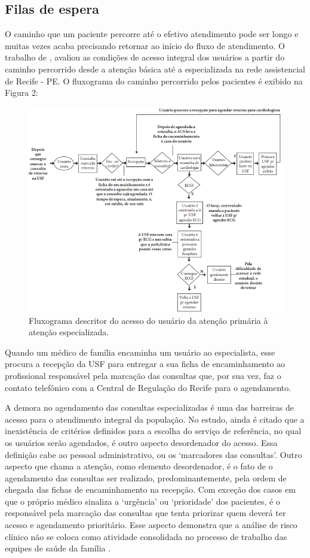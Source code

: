      \subsection{Filas de espera}
    
    O caminho que um paciente percorre até o efetivo atendimento pode ser longo e muitas vezes acaba precisando retornar ao início do fluxo de atendimento. O trabalho de , avaliou as condições de acesso integral dos usuários a partir do caminho percorrido desde a atenção básica até a especializada na rede assistencial de Recife - PE. O fluxograma do caminho percorrido pelos pacientes é exibido na Figura 2:
    
     \begin{figure}[htbp]
        	\centering
            \caption{Fluxograma descritor do acesso do usuário da atenção primária à atenção especializada.}
            \label{fig:images/fluxograma-trajetoria-usf-pe}
            \includegraphics[width=0.8\linewidth]{images/fluxograma-trajetoria-usf-pe}
        \end{figure}
        
    Quando um médico de família encaminha um usuário ao especialista, esse procura a recepção da USF para entregar a sua ficha de encaminhamento ao profissional responsável pela marcação das consultas que, por sua vez, faz o contato telefônico com a Central de Regulação do Recife para o agendamento.
    
    A demora no agendamento das consultas especializadas é uma das barreiras de acesso para o atendimento integral da população. No estudo, ainda é citado que a inexistência de critérios definidos para a escolha do serviço de referência, no qual os usuários serão agendados, é outro aspecto desordenador do acesso. Essa definição cabe ao pessoal administrativo, ou os ‘marcadores das consultas’. Outro aspecto que chama a atenção, como elemento desordenador, é o fato de o agendamento das consultas ser realizado, predominantemente, pela ordem de chegada das fichas de encaminhamento na recepção. Com exceção dos casos em que o próprio médico sinaliza a ‘urgência’ ou ‘prioridade’ dos pacientes, é o responsável pela marcação das consultas que tenta priorizar
    quem deverá ter acesso e agendamento prioritário. Esse aspecto demonstra que a análise de risco clínico não se coloca como atividade consolidada no processo de trabalho das equipes de saúde da família \cite{SOUZA2014}.
    
